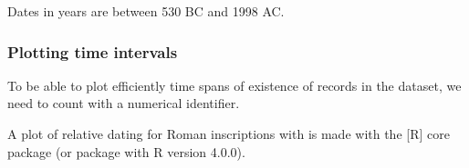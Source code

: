 \documentclass[a4paper,12pt,english]{sphinxhowto}
\begin{document}
Dates in years are between 530 BC and 1998 AC.


\ignorespaces 

\subsubsection{Plotting time intervals}
\label{\detokenize{Time:plotting-time-intervals}}\label{\detokenize{Time:index-0}}
To be able to plot efficiently time spans of existence of records in the  dataset, we
need to count with a numerical identifier.
\begin{quote}

\begin{sphinxVerbatim}[commandchars=\\\{\},formatcom=\footnotesize]
   
\end{sphinxVerbatim}
\end{quote}

A plot of relative dating for Roman inscriptions with  is made with the {[}R{]} 
core package (or  package with R version 4.0.0).
\begin{quote}

\begin{sphinxVerbatim}[commandchars=\\\{\},formatcom=\footnotesize]
      
        
    
     
\end{sphinxVerbatim}
\end{quote}
\end{document}
